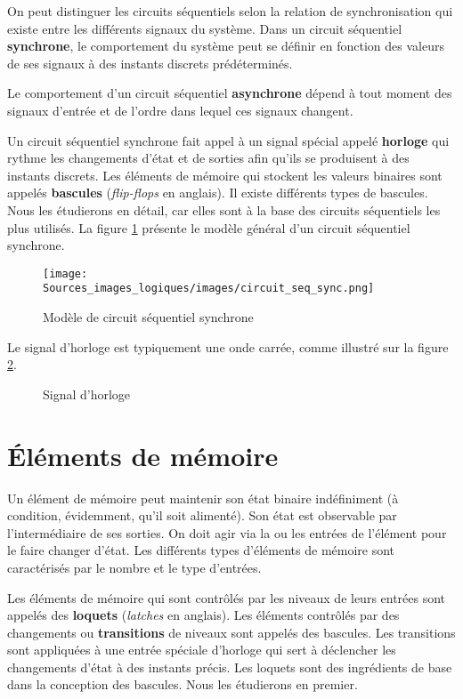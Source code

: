 \documentclass[letter, oneside]{book}
\begin{document}
On peut distinguer les circuits séquentiels selon la relation de
synchronisation qui existe entre les différents signaux du
système. Dans un circuit séquentiel \textbf{synchrone}, le comportement du
système peut se définir en fonction des valeurs de ses signaux à des
instants discrets prédéterminés. 

Le comportement d'un circuit séquentiel \textbf{asynchrone} dépend à tout
moment des signaux d'entrée et de l'ordre dans lequel ces signaux
changent.

Un circuit séquentiel synchrone fait appel à un signal spécial appelé
\textbf{horloge} qui rythme les changements d'état et de sorties afin qu'ils se
produisent à des instants discrets. Les éléments de mémoire qui
stockent les valeurs binaires sont appelés \textbf{bascules} (\emph{flip-flops} en
anglais). Il existe différents types de bascules. Nous les étudierons
en détail, car elles sont à la base des circuits séquentiels les plus
utilisés. La figure \ref{fig:org2f17b69} présente le modèle général d'un
circuit séquentiel synchrone.

\begin{figure}[htbp]
\centering
\texttt{[image: Sources\_images\_logiques/images/circuit\_seq\_sync.png]}
\caption{\label{fig:org2f17b69}Modèle de circuit séquentiel synchrone}
\end{figure}

Le signal d'horloge est typiquement une onde carrée, comme illustré
sur la figure \ref{fig:orgc734056}.

\begin{figure}[htbp]
\centering

\caption{\label{fig:orgc734056}Signal d'horloge}
\end{figure}

\section{Éléments de mémoire}
\label{sec:org665db80}

Un élément de mémoire peut maintenir son état binaire indéfiniment (à
condition, évidemment, qu'il soit alimenté). Son état est observable
par l'intermédiaire de ses sorties. On doit agir via la ou les entrées
de l'élément pour le faire changer d'état. Les différents types
d'éléments de mémoire sont caractérisés par le nombre et le type
d'entrées.

Les éléments de mémoire qui sont contrôlés par les niveaux de leurs
entrées sont appelés des \textbf{loquets} (\emph{latches} en anglais). Les
éléments contrôlés par des changements ou \textbf{transitions} de niveaux
sont appelés des bascules. Les transitions sont appliquées à une
entrée spéciale d'horloge qui sert à déclencher les changements d'état
à des instants précis. Les loquets sont des ingrédients de base dans
la conception des bascules. Nous les étudierons en premier.
\end{document}
